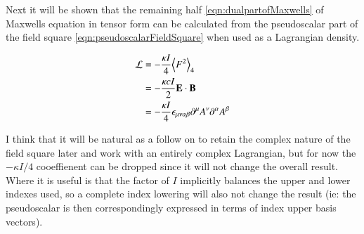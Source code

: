 \documentclass{article}
\newcommand{\LL}[0]{\mathcal{L}}
\newcommand{\gpgrade}[2] {{\left\langle{{#1}}\right\rangle}_{#2}}
\begin{document}
Next it will be shown that the remaining half \ref{eqn:dualpartofMaxwells}
of Maxwells equation in tensor form can be calculated from the pseudoscalar part of the field square 
\ref{eqn:pseudoscalarFieldSquare} when used as a Lagrangian density.

\begin{align*}
\LL 
&= -\frac{\kappa I}{4} \gpgrade{F^2}{4} \\
&= -\frac{\kappa c I}{2} \BE \cdot \BB \\
&= -\frac{\kappa I}{4} \epsilon_{\mu\nu\alpha\beta} \partial^{\mu} A^{\nu} \partial^{\alpha} A^{\beta}
\end{align*}

I think that it will be natural as a follow on to retain the complex nature of the field square later and work with an entirely complex Lagrangian, but for now 
the $-\kappa I/4$ cooeffienent can be dropped since it will not change the overall result.  Where it is useful is that the factor of $I$ implicitly balances the upper and lower indexes used, so a complete index lowering will also not change the result (ie: the pseudoscalar is then correspondingly expressed in terms of index upper basis vectors).
\end{document}
